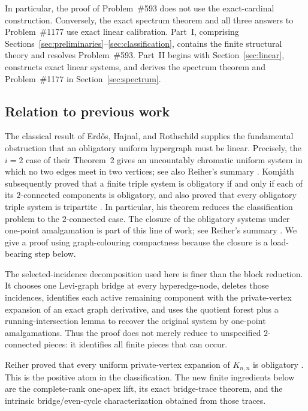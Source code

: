 \documentclass[11pt]{amsart}
\theoremstyle{definition}
\theoremstyle{remark}
\numberwithin{equation}{section}
\begin{document}
In particular, the proof of Problem~\#593 does not use the exact-cardinal
construction.  Conversely, the exact spectrum theorem and all three
answers to Problem~\#1177 use exact linear calibration.  Part~I, comprising Sections~\ref{sec:preliminaries}--\ref{sec:classification},
contains the finite structural theory and resolves Problem~\#593.
Part~II begins with Section~\ref{sec:linear}, constructs exact linear
systems, and derives the spectrum theorem and Problem~\#1177 in
Section~\ref{sec:spectrum}.

\subsection{Relation to previous work}

The classical result of Erd\H{o}s, Hajnal, and Rothschild supplies the
fundamental obstruction that an obligatory uniform hypergraph must be
linear.  Precisely, the $i=2$ case of their Theorem~2
\cite[p.~532]{EHR1973} gives an uncountably chromatic uniform system in
which no two edges meet in two vertices; see also Reiher's summary
\cite[p.~1]{ReiherObligatory}.  Komj\'ath subsequently proved that a
finite triple system is obligatory if and only if each of its
$2$-connected components is obligatory, and also proved that every
obligatory triple system is tripartite
\cite[pp.~233--238]{Komjath2001}.  In particular, his theorem reduces the
classification problem to the $2$-connected case.  The closure of the
obligatory systems under one-point amalgamation is part of this line of
work; see Reiher's summary \cite[p.~1]{ReiherObligatory}.  We give a
proof using graph-colouring compactness because the closure is a load-bearing step below.

The selected-incidence decomposition used here is finer than the block
reduction.  It chooses one Levi-graph bridge at every hyperedge-node,
deletes those incidences, identifies each active remaining component
with the private-vertex expansion of an exact graph derivative, and
uses the quotient forest plus a running-intersection lemma to recover
the original system by one-point amalgamations.  Thus the proof does not
merely reduce to unspecified $2$-connected pieces: it identifies all
finite pieces that can occur.

Reiher proved that every uniform private-vertex expansion of
$K_{n,n}$ is obligatory \cite[Theorem~1.2]{ReiherObligatory}.  This is
the positive atom in the classification.  The new finite ingredients
below are the complete-rank one-apex lift, its exact bridge-trace theorem,
and the intrinsic bridge/even-cycle characterization obtained from those
traces.
\end{document}
